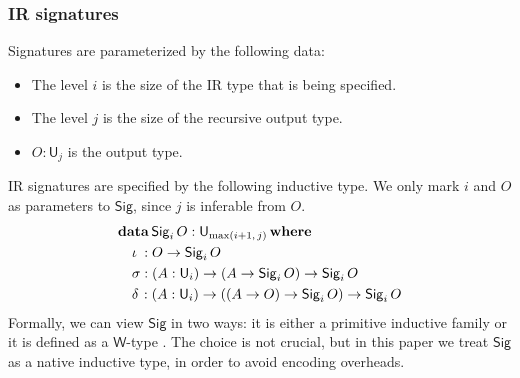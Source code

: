 \documentclass[acmsmall,screen,review,anonymous]{acmart}
\newcommand{\msf}[1]{{\mathsf{#1}}}
\newcommand{\mbf}[1]{{\mathbf{#1}}}
\newcommand{\data}{\mbf{data}}
\newcommand{\U}{\msf{U}}
\newcommand{\where}{\mbf{where}}
\newcommand{\Sig}{\msf{Sig}}
\begin{document}
\subsubsection{IR signatures}\label{sec:ir-signatures}
Signatures are parameterized by the following data:
\begin{itemize}
\item The level $i$ is the size of the IR type that is being specified.
\item The level $j$ is the size of the recursive output type.
\item $O : \U_j$ is the output type.
\end{itemize}
IR signatures are specified by the following inductive type. We only mark $i$ and $O$ as parameters to $\Sig$,
since $j$ is inferable from $O$.
\begin{alignat*}{4}
  &\data\, \Sig_i\,O : \U_{\max(i+1,\,j)}\,\where\\
  &\quad \iota\hspace{0.25em}  : O \to \Sig_i\,O \\
  &\quad \sigma               : (A : \U_i) \to (A \to \Sig_i\,O) \to \Sig_i\,O \\
  &\quad \delta\hspace{0.1em} : (A : \U_i) \to ((A \to O) \to \Sig_i\,O) \to \Sig_i\,O
\end{alignat*}
Formally, we can view $\Sig$ in two ways: it is either a primitive inductive family \cite{TODO} or
it is defined as a $\msf{W}$-type \cite{whynotw}. The choice is not crucial, but in this paper
we treat $\Sig$ as a native inductive type, in order to avoid encoding overheads.
\end{document}

